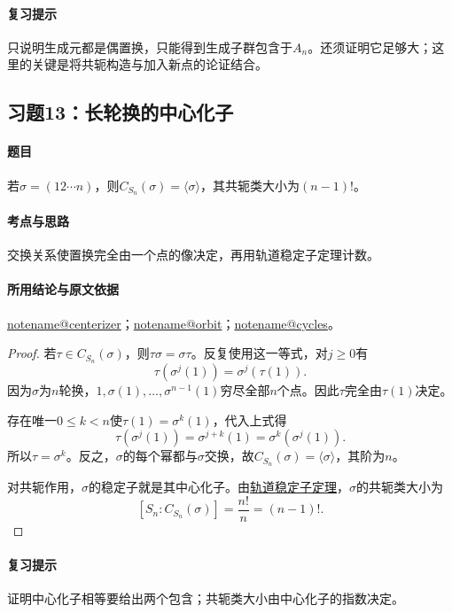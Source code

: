 \documentclass[UTF8,a4paper,11pt,fontset=windows]{ctexart}
\makeatletter
\newcommand{\noteref}[1]{\hyperref[note:#1]{\csname notename@#1\endcsname}}
\newcommand{\proofref}[2]{\hyperref[note:#1]{#2}}
\newcommand{\exref}[2]{\hyperref[ex:#1:#2]{第#1章习题#2}}
\makeatother
\begin{document}
\paragraph{复习提示}
只说明生成元都是偶置换，只能得到生成子群包含于$A_n$。还须证明它足够大；这里的关键是将共轭构造与加入新点的论证结合。


\subsection{习题13：\texorpdfstring{长轮换的中心化子}{长轮换的中心化子}}
\label{ex:2:13}

\paragraph{题目}
若$\sigma=(12\cdots n)$，则$C_{S_n}(\sigma)=\langle\sigma\rangle$，其共轭类大小为$(n-1)!$。

\paragraph{考点与思路}
交换关系使置换完全由一个点的像决定，再用轨道稳定子定理计数。

\paragraph{所用结论与原文依据}
\noteref{centerizer}；\noteref{orbit}；\noteref{cycles}。


\begin{proof}
若$\tau\in C_{S_n}(\sigma)$，则$\tau\sigma=\sigma\tau$。反复使用这一等式，对$j\geq0$有
\[
\tau(\sigma^j(1))=\sigma^j(\tau(1)).
\]
因为$\sigma$为$n$轮换，$1,\sigma(1),\ldots,\sigma^{n-1}(1)$穷尽全部$n$个点。因此$\tau$完全由$\tau(1)$决定。

存在唯一$0\leq k<n$使$\tau(1)=\sigma^k(1)$，代入上式得
\[
\tau(\sigma^j(1))=\sigma^{j+k}(1)=\sigma^k(\sigma^j(1)).
\]
所以$\tau=\sigma^k$。反之，$\sigma$的每个幂都与$\sigma$交换，故$C_{S_n}(\sigma)=\langle\sigma\rangle$，其阶为$n$。

对共轭作用，$\sigma$的稳定子就是其中心化子。由\proofref{orbit}{轨道稳定子定理}，$\sigma$的共轭类大小为
\[
[S_n:C_{S_n}(\sigma)]=\frac{n!}{n}=(n-1)!.
\]
\end{proof}

\paragraph{复习提示}
证明中心化子相等要给出两个包含；共轭类大小由中心化子的指数决定。
\end{document}
